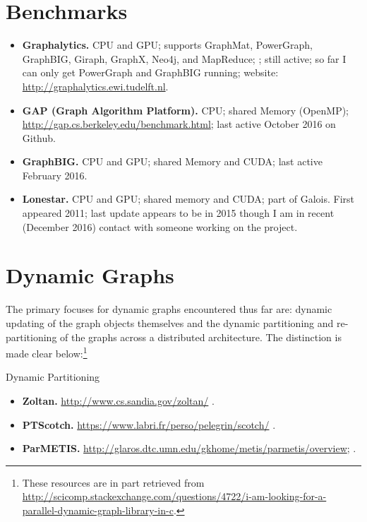 \documentclass[11pt]{article}
\begin{document}
\section{Benchmarks}
\begin{itemize}
	\item \textbf{Graphalytics.} CPU and GPU; supports GraphMat, PowerGraph, GraphBIG, Giraph, GraphX, Neo4j, and MapReduce; \cite{Capota:2015:Graphalytics}; still active; so far I can only get PowerGraph and GraphBIG running; website: \url{http://graphalytics.ewi.tudelft.nl}.

	\item \textbf{GAP (Graph Algorithm Platform).} CPU; shared Memory (OpenMP); \url{http://gap.cs.berkeley.edu/benchmark.html}; last active October 2016 on Github. \cite{Beamer:2015:GAPBench}

	\item \textbf{GraphBIG.} CPU and GPU; shared Memory and CUDA; last active February 2016.

	\item \textbf{Lonestar.} CPU and GPU; shared memory and CUDA; part of Galois. First appeared 2011; last update appears to be in 2015 though I am in recent (December 2016) contact with someone working on the project.
\end{itemize}

\section{Dynamic Graphs}
The primary focuses for dynamic graphs encountered thus far are: dynamic updating of the graph objects themselves and the dynamic partitioning and re-partitioning of the graphs across a distributed architecture. The distinction is made clear below:\footnote{These resources are in part retrieved from \url{http://scicomp.stackexchange.com/questions/4722/i-am-looking-for-a-parallel-dynamic-graph-library-in-c}.}

Dynamic Partitioning
\begin{itemize}
	\item \textbf{Zoltan.} \url{http://www.cs.sandia.gov/zoltan/} \cite{Devine:2000:Zoltan}.
	\item \textbf{PTScotch.} \url{https://www.labri.fr/perso/pelegrin/scotch/} \cite{Chevalier:2008:PTScotch}.
	\item \textbf{ParMETIS.} \url{http://glaros.dtc.umn.edu/gkhome/metis/parmetis/overview}; \cite{Karypis:1998:ParMETIS}.
\end{itemize}
\end{document}
